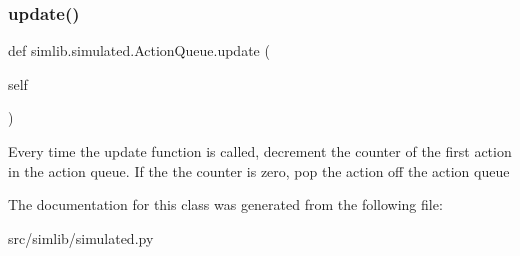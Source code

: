 \subsubsection{\texorpdfstring{update()}{update()}}
{\footnotesize\ttfamily def simlib.\+simulated.\+Action\+Queue.\+update (\begin{DoxyParamCaption}\item[{}]{self }\end{DoxyParamCaption})}

\begin{DoxyVerb}Every time the update function is called, decrement the counter of 
the first action in the action queue. If the the counter is zero, 
pop the action off the action queue
\end{DoxyVerb}
 

The documentation for this class was generated from the following file\+:\begin{DoxyCompactItemize}
\item 
src/simlib/simulated.\+py\end{DoxyCompactItemize}
